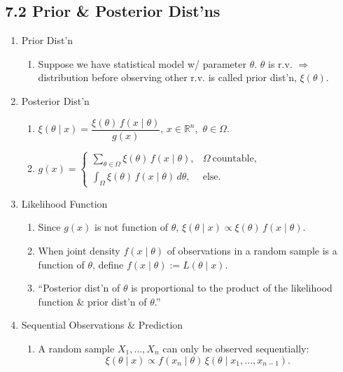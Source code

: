 \documentclass[11pt]{article}
\begin{document}
\subsection*{7.2 Prior \& Posterior Dist'ns}
\begin{enumerate}[label=\Roman*.]
  \item Prior Dist'n
  \begin{enumerate}[label=\Alph*.]
    \item Suppose we have statistical model w/ parameter $\theta$. $\theta$ is r.v. $\Rightarrow$ distribution before observing other r.v. is called prior dist'n, $\xi(\theta)$.
  \end{enumerate}
  \item Posterior Dist'n
  \begin{enumerate}[label=\Alph*.]
    \item $\xi(\theta\mid x)=\dfrac{\xi(\theta)\,f(x\mid\theta)}{g(x)}$, \quad $x\in\mathbb{R}^{n}$,\ $\theta\in\Omega$.
    \item $g(x)=
    \begin{cases}
      \sum_{\theta\in\Omega}\xi(\theta)\,f(x\mid\theta), & \Omega\ \text{countable},\\
      \int_{\Omega}\xi(\theta)\,f(x\mid\theta)\,d\theta, & \text{else}.
    \end{cases}$
  \end{enumerate}
  \item Likelihood Function
  \begin{enumerate}[label=\Alph*.]
    \item Since $g(x)$ is not function of $\theta$, $\xi(\theta\mid x)\propto \xi(\theta)\,f(x\mid\theta)$.
    \item When joint density $f(x\mid\theta)$ of observations in a random sample is a function of $\theta$, define $f(x\mid\theta):=L(\theta\mid x)$.
    \item ``Posterior dist'n of $\theta$ is proportional to the product of the likelihood function \& prior dist'n of $\theta$.''
  \end{enumerate}
  \item Sequential Observations \& Prediction
  \begin{enumerate}[label=\Alph*.]
    \item A random sample $X_{1},\dots,X_{n}$ can only be observed sequentially:
    \[
      \xi(\theta\mid x)\propto f(x_{n}\mid\theta)\,\xi(\theta\mid x_{1},\dots,x_{n-1}).
    \]
  \end{enumerate}
\end{enumerate}
\end{document}

